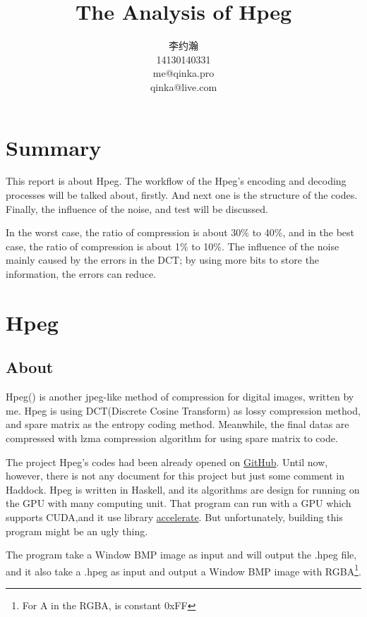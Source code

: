 \documentclass{article}
\title{The Analysis of Hpeg}
\author{李约瀚 \\ 14130140331 \\ me@qinka.pro \\ qinka@live.com}
\begin{document}
\maketitle
\newpage
\tableofcontents
\newpage

\section{Summary}
\label{sec:summary}

This report is about Hpeg. The workflow of the Hpeg's encoding and decoding processes will be talked about, firstly. And next one is the structure of the codes. Finally, the influence of the noise, and test will be discussed.

In the worst case, the ratio of compression is about 30\% to 40\%,
and in the best case, the ratio of compression is about 1\% to 10\%.
The influence of the noise mainly caused by the errors in the DCT; by using more bits to store the 
information, the errors can reduce.

\section{Hpeg}
\label{sec:hpeg}

\subsection{About}
\label{sec:hpeg:about}

Hpeg() is another jpeg-like method of compression for digital images, written by me.
Hpeg is using DCT(Discrete Cosine Transform) as lossy compression method, and spare matrix as the entropy coding method.
Meanwhile, the final datas are compressed with lzma compression algorithm for using spare matrix to code. 

The project Hpeg's codes had been already opened on \href{http://github.com/Qinka/hpeg.hs}{GitHub}.
Until now, however, there is not any document for this project but just some comment in Haddock.
Hpeg is written in Haskell, and its algorithms are design for running on the GPU with many computing unit.
That program can run with a GPU which supports CUDA,and it use library \href{https://github.com/AccelerateHS/accelerate}{accelerate}.
But unfortunately, building this program might be an ugly thing.

The program take a Window BMP image as input and will output the .hpeg file,
and it also take a .hpeg as input and output a Window BMP image with RGBA\footnote{For A in the RGBA, is constant 0xFF}.
\end{document}
